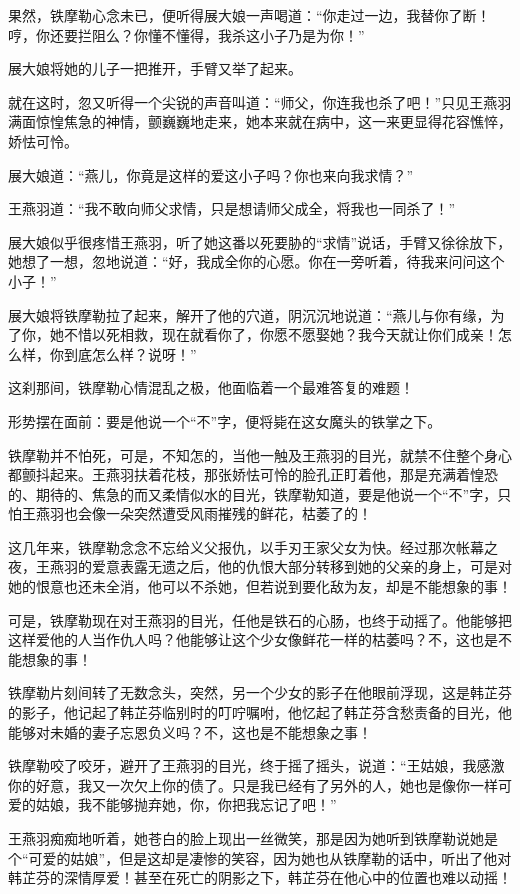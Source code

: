 \documentclass[12pt,oneside]{book}
\begin{document}
果然，铁摩勒心念未已，便听得展大娘一声喝道：``你走过一边，我替你了断！哼，你还要拦阻么？你懂不懂得，我杀这小子乃是为你！''

展大娘将她的儿子一把推开，手臂又举了起来。

就在这时，忽又听得一个尖锐的声音叫道：``师父，你连我也杀了吧！''只见王燕羽满面惊惶焦急的神情，颤巍巍地走来，她本来就在病中，这一来更显得花容憔悴，娇怯可怜。

展大娘道：``燕儿，你竟是这样的爱这小子吗？你也来向我求情？''

王燕羽道：``我不敢向师父求情，只是想请师父成全，将我也一同杀了！''

展大娘似乎很疼惜王燕羽，听了她这番以死要胁的``求情''说话，手臂又徐徐放下，她想了一想，忽地说道：``好，我成全你的心愿。你在一旁听着，待我来问问这个小子！''

展大娘将铁摩勒拉了起来，解开了他的穴道，阴沉沉地说道：``燕儿与你有缘，为了你，她不惜以死相救，现在就看你了，你愿不愿娶她？我今天就让你们成亲！怎么样，你到底怎么样？说呀！''

这刹那间，铁摩勒心情混乱之极，他面临着一个最难答复的难题！

形势摆在面前：要是他说一个``不''字，便将毙在这女魔头的铁掌之下。

铁摩勒并不怕死，可是，不知怎的，当他一触及王燕羽的目光，就禁不住整个身心都颤抖起来。王燕羽扶着花枝，那张娇怯可怜的脸孔正盯着他，那是充满着惶恐的、期待的、焦急的而又柔情似水的目光，铁摩勒知道，要是他说一个``不''字，只怕王燕羽也会像一朵突然遭受风雨摧残的鲜花，枯萎了的！

这几年来，铁摩勒念念不忘给义父报仇，以手刃王家父女为快。经过那次帐幕之夜，王燕羽的爱意表露无遗之后，他的仇恨大部分转移到她的父亲的身上，可是对她的恨意也还未全消，他可以不杀她，但若说到要化敌为友，却是不能想象的事！

可是，铁摩勒现在对王燕羽的目光，任他是铁石的心肠，也终于动摇了。他能够把这样爱他的人当作仇人吗？他能够让这个少女像鲜花一样的枯萎吗？不，这也是不能想象的事！

铁摩勒片刻间转了无数念头，突然，另一个少女的影子在他眼前浮现，这是韩芷芬的影子，他记起了韩芷芬临别时的叮咛嘱咐，他忆起了韩芷芬含愁责备的目光，他能够对未婚的妻子忘恩负义吗？不，这也是不能想象之事！

铁摩勒咬了咬牙，避开了王燕羽的目光，终于摇了摇头，说道：``王姑娘，我感激你的好意，我又一次欠上你的债了。只是我已经有了另外的人，她也是像你一样可爱的姑娘，我不能够抛弃她，你，你把我忘记了吧！''

王燕羽痴痴地听着，她苍白的脸上现出一丝微笑，那是因为她听到铁摩勒说她是个``可爱的姑娘''，但是这却是凄惨的笑容，因为她也从铁摩勒的话中，听出了他对韩芷芬的深情厚爱！甚至在死亡的阴影之下，韩芷芬在他心中的位置也难以动摇！
\end{document}
